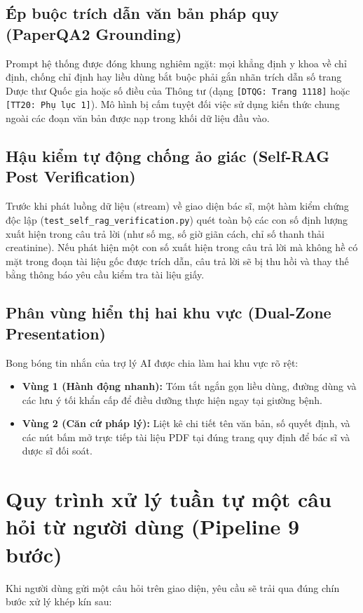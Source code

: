 \documentclass[12pt,a4paper]{article}
\begin{document}
\subsection{Ép buộc trích dẫn văn bản pháp quy (PaperQA2 Grounding)}
Prompt hệ thống được đóng khung nghiêm ngặt: mọi khẳng định y khoa về chỉ định, chống chỉ định hay liều dùng bắt buộc phải gắn nhãn trích dẫn số trang Dược thư Quốc gia hoặc số điều của Thông tư (dạng \texttt{[DTQG: Trang 1118]} hoặc \texttt{[TT20: Phụ lục 1]}). Mô hình bị cấm tuyệt đối việc sử dụng kiến thức chung ngoài các đoạn văn bản được nạp trong khối dữ liệu đầu vào.

\subsection{Hậu kiểm tự động chống ảo giác (Self-RAG Post Verification)}
Trước khi phát luồng dữ liệu (stream) về giao diện bác sĩ, một hàm kiểm chứng độc lập (\texttt{test\_self\_rag\_verification.py}) quét toàn bộ các con số định lượng xuất hiện trong câu trả lời (như số mg, số giờ giãn cách, chỉ số thanh thải creatinine). Nếu phát hiện một con số xuất hiện trong câu trả lời mà không hề có mặt trong đoạn tài liệu gốc được trích dẫn, câu trả lời sẽ bị thu hồi và thay thế bằng thông báo yêu cầu kiểm tra tài liệu giấy.

\subsection{Phân vùng hiển thị hai khu vực (Dual-Zone Presentation)}
Bong bóng tin nhắn của trợ lý AI được chia làm hai khu vực rõ rệt:
\begin{itemize}[leftmargin=1.5em]
    \item \textbf{Vùng 1 (Hành động nhanh):} Tóm tắt ngắn gọn liều dùng, đường dùng và các lưu ý tối khẩn cấp để điều dưỡng thực hiện ngay tại giường bệnh.
    \item \textbf{Vùng 2 (Căn cứ pháp lý):} Liệt kê chi tiết tên văn bản, số quyết định, và các nút bấm mở trực tiếp tài liệu PDF tại đúng trang quy định để bác sĩ và dược sĩ đối soát.
\end{itemize}

\section{Quy trình xử lý tuần tự một câu hỏi từ người dùng (Pipeline 9 bước)}

Khi người dùng gửi một câu hỏi trên giao diện, yêu cầu sẽ trải qua đúng chín bước xử lý khép kín sau:
\end{document}
